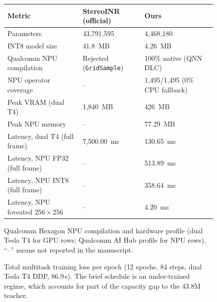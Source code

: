 \begin{figure}[t]
\centering
\small
\begin{tabular}{@{}lll@{}}
\toprule
\textbf{Metric} & \textbf{StereoINR (official)} & \textbf{Ours} \\
\midrule
Parameters & 43{,}791{,}595 & 4{,}468{,}180 \\
INT8 model size & 41.8~MB & 4.26~MB \\
Qualcomm NPU compilation & Rejected (\texttt{GridSample}) & 100\% native (QNN DLC) \\
NPU operator coverage & -- & 1,495/1,495 (0\% CPU fallback) \\
Peak VRAM (dual T4) & 1{,}840~MB & 426~MB \\
Peak NPU memory & -- & 77.29~MB \\
Latency, dual T4 (full frame) & 7{,}500.00~ms & 130.65~ms \\
Latency, NPU FP32 (full frame) & -- & 513.89~ms \\
Latency, NPU INT8 (full frame) & -- & 358.64~ms \\
Latency, NPU foveated $256{\times}256$ & -- & 4.20~ms \\
\bottomrule
\end{tabular}
\caption{Qualcomm Hexagon NPU compilation and hardware profile (dual Tesla T4 for GPU rows; Qualcomm AI Hub profile for NPU rows). ``--'' means not reported in the manuscript.}
\label{fig:npu_profile}
\end{figure}

\begin{figure}[t]
\centering
{}
\caption{Total multitask training loss per epoch (12 epochs, 84 steps, dual Tesla T4 DDP, 86.9\,s). The brief schedule is an under-trained regime, which accounts for part of the capacity gap to the 43.8M teacher.}
\label{fig:loss}
\end{figure}

